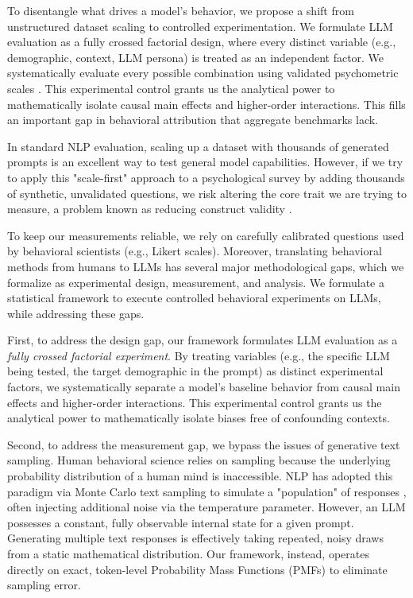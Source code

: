 To disentangle what drives a model's behavior, we propose a shift from unstructured dataset scaling to controlled experimentation. 
We formulate LLM evaluation as a fully crossed factorial design, where every distinct variable (e.g., demographic, context, LLM persona) is treated as an independent factor. 
We systematically evaluate every possible combination using validated psychometric scales \citep{cronbach1950further, batterton2017likert}. 
This experimental control grants us the analytical power to mathematically isolate causal main effects and higher-order interactions. This fills an important gap in behavioral attribution that aggregate benchmarks lack. 

In standard NLP evaluation, scaling up a dataset with thousands of generated prompts is an excellent way to test general model capabilities. However, if we try to apply this "scale-first" approach to a psychological survey by adding thousands of synthetic, unvalidated questions, we risk altering the core trait we are trying to measure, a problem known as reducing construct validity \citep{flake2020measurement}.

To keep our measurements reliable, we rely on carefully calibrated questions used by behavioral scientists (e.g., Likert scales). Moreover, translating behavioral methods from humans to LLMs has several major methodological gaps, which we formalize as experimental design, measurement, and analysis. 
We formulate a statistical framework to execute controlled behavioral experiments on LLMs, while addressing these gaps.

First, to address the design gap, our framework formulates LLM evaluation as a \emph{fully crossed factorial experiment}. By treating variables (e.g., the specific LLM being tested, the target demographic in the prompt) as distinct experimental factors, we systematically separate a model's baseline behavior from causal main effects and higher-order interactions. This experimental control grants us the analytical power to mathematically isolate biases free of confounding contexts.

Second, to address the measurement gap, we bypass the issues of generative text sampling. Human behavioral science relies on sampling because the underlying probability distribution of a human mind is inaccessible. NLP has adopted this paradigm via Monte Carlo text sampling to simulate a "population" of responses \citep{wadi2025a}, often injecting additional noise via the temperature parameter. However, an LLM possesses a constant, fully observable internal state for a given prompt. Generating multiple text responses is effectively taking repeated, noisy draws from a static mathematical distribution. Our framework, instead, operates directly on exact, token-level Probability Mass Functions (PMFs) to eliminate sampling error.

